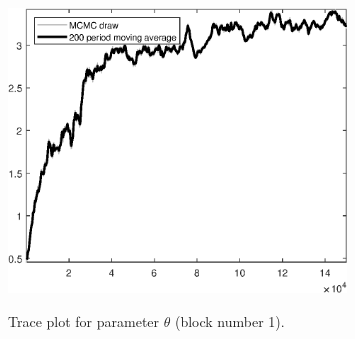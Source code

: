 \begin{figure}[H]
\centering
  \includegraphics[width=0.8\textwidth]{BRS_sectoral_KK/graphs/TracePlot_theta_blck_1}\\
    \caption{Trace plot for parameter ${\theta}$ (block number 1).}
\end{figure}
